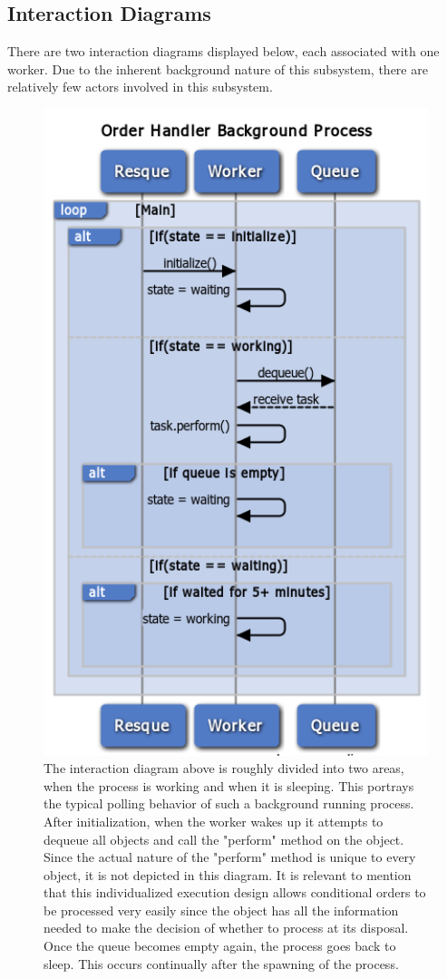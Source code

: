 \newpage

\subsection{Interaction Diagrams}

There are two interaction diagrams displayed below, each associated with one worker. Due to the inherent background nature of this subsystem, there are relatively few actors involved in this subsystem.\\

\begin{figure}[!h]
\centering
\includegraphics[width=4.5in]{./Diagrams/ComponentModels/stateMachineDiagrams/Worker1/worker1.png}
\caption{The interaction diagram above is roughly divided into two areas, when the process is working and when it is sleeping. This portrays the typical polling behavior of such a background running process. After initialization, when the worker wakes up it attempts to dequeue all objects and call the "perform" method on the object. Since the actual nature of the "perform" method is unique to every object, it is not depicted in this diagram. It is relevant to mention that this individualized execution design allows conditional orders to be processed very easily since the object has all the information needed to make the decision of whether to process at its disposal. Once the queue becomes empty again, the process goes back to sleep. This occurs continually after the spawning of the process.}
\end{figure}

